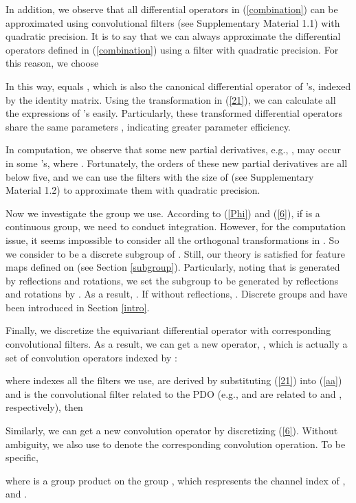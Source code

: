 \documentclass{article}
\begin{document}
In addition, we observe that all differential operators in (\ref{combination}) can be approximated using  convolutional filters (see Supplementary Material 1.1) with quadratic precision. It is to say that we can always approximate the differential operators defined in (\ref{combination}) using a  filter with quadratic precision. For this reason, we choose 

In this way,  equals , which is also the canonical differential operator of 's, indexed by the identity matrix. Using the transformation in (\ref{21}), we can calculate all the expressions of 's easily. Particularly, these transformed differential operators share the same parameters , indicating greater parameter efficiency.

In computation, we observe that some new partial derivatives, e.g., , may occur in some 's, where . Fortunately, the orders of these new partial derivatives are all below five, and we can use the filters with the size of  (see Supplementary Material 1.2) to approximate them with quadratic precision. 

Now we investigate the group we use. According to (\ref{Phi}) and (\ref{6}), if  is a continuous group, we need to conduct integration. However, for the computation issue, it seems impossible to consider all the orthogonal transformations in .
So we consider  to be a discrete subgroup of . Still, our theory is satisfied for feature maps defined on  (see Section \ref{subgroup}). 
Particularly, noting that  is generated by reflections and rotations, we set the subgroup  to be generated by reflections and rotations by . 
As a result, . If without reflections, . Discrete groups  and  have been introduced in Section \ref{intro}.

Finally, we discretize the equivariant differential operator  with corresponding convolutional filters. As a result, we can get a new operator, , which is actually a set of convolution operators indexed by :

where  indexes all the filters we use,  are derived by substituting (\ref{21}) into (\ref{aa}) and  is the convolutional filter related to the PDO  (e.g.,  and  are related to  and , respectively), then 


Similarly, we can get a new convolution operator  by discretizing (\ref{6}). Without ambiguity, we also use  to denote the corresponding convolution operation. To be specific,

where  is a group product on the group , which respresents the channel index of , and .
\end{document}
